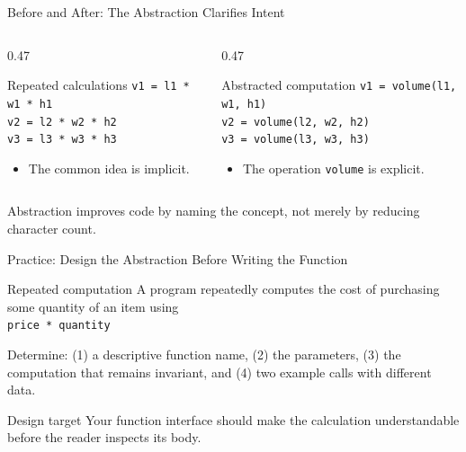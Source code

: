 \documentclass[aspectratio=169,10pt]{beamer}
\begin{document}
\begin{frame}{Before and After: The Abstraction Clarifies Intent}
  \begin{columns}[T,onlytextwidth]
    \begin{column}{0.47\textwidth}
      \begin{block}{Repeated calculations}
        \texttt{v1 = l1 * w1 * h1}\\
        \texttt{v2 = l2 * w2 * h2}\\
        \texttt{v3 = l3 * w3 * h3}
      \end{block}
      \begin{itemize}
        \item The common idea is implicit.
      \end{itemize}
    \end{column}

    \begin{column}{0.47\textwidth}
      \begin{block}{Abstracted computation}
        \texttt{v1 = volume(l1, w1, h1)}\\
        \texttt{v2 = volume(l2, w2, h2)}\\
        \texttt{v3 = volume(l3, w3, h3)}
      \end{block}
      \begin{itemize}
        \item The operation \texttt{volume} is explicit.
      \end{itemize}
    \end{column}
  \end{columns}

  \begin{keyidea}
    Abstraction improves code by naming the concept, not merely by reducing character count.
  \end{keyidea}
\end{frame}

\begin{frame}{Practice: Design the Abstraction Before Writing the Function}
  \begin{block}{Repeated computation}
    A program repeatedly computes the cost of purchasing some quantity of an item using\\[0.08in]
    \centering
    \texttt{price * quantity}
  \end{block}

  \begin{activity}
    Determine: (1) a descriptive function name, (2) the parameters, (3) the computation that remains invariant, and (4) two example calls with different data.
  \end{activity}

  \begin{block}{Design target}
    Your function interface should make the calculation understandable before the reader inspects its body.
  \end{block}
\end{frame}
\end{document}

